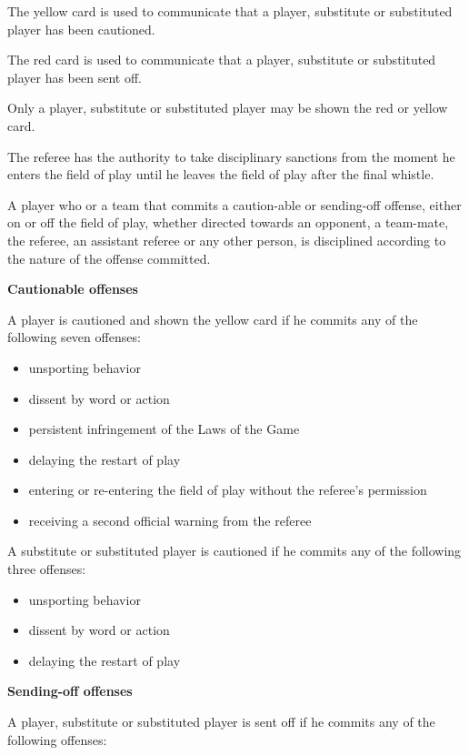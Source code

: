 \documentclass[a4paper]{article}
\begin{document}
The yellow card is used to communicate that a player, substitute or substituted player has been cautioned.

The red card is used to communicate that a player, substitute or substituted player has been sent off.

Only a player, substitute or substituted player may be shown the red or yellow card.

The referee has the authority to take disciplinary sanctions from the moment he enters the field of play until he leaves the field of play after the final whistle.

A player who or a team that commits a caution-able or sending-off offense, either on or off the field of play, whether directed towards an opponent, a team-mate, the referee, an assistant referee or any other person, is disciplined according to the nature of the offense committed.

\bigskip

{\bfseries Cautionable offenses }

A player is cautioned and shown the yellow card if he commits any of the following seven offenses:

\begin{itemize}
\item unsporting behavior 
\item dissent by word or action 
\item persistent infringement of the Laws of the Game 
\item delaying the restart of play 
\item entering or re-entering the field of play without the referee's permission
\item receiving a second official warning from the referee
\end{itemize}

\bigskip

A substitute or substituted player is cautioned if he commits any of the following three offenses:

\begin{itemize}
\item unsporting behavior
\item dissent by word or action
\item delaying the restart of play
\end{itemize}

{\bfseries Sending-off offenses}

A player, substitute or substituted player is sent off if he commits any of the following offenses:
\end{document}

